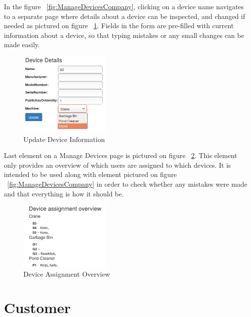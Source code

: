 In the figure ~\ref{fig:ManageDevicesCompany}, clicking on a device name navigates to a separate page where details about a device can be inspected, and changed if needed as pictured on figure ~\ref{fig:DeviceDetailsUpdate}. Fields in the form are pre-filled with current information about a device, so that typing mistakes or any small changes can be made easily.

\begin{figure}[ht]
	\begin{center}
		\includegraphics[width=0.4\textwidth]{images/implementation/DeviceDetailsUpdate}
		\caption{Update Device Information}
		\label{fig:DeviceDetailsUpdate}
	\end{center}
\end{figure}

Last element on a Manage Devices page is pictured on figure ~\ref{fig:DeviceAssignment}. This element only provides an overview of which users are assigned to which devices. It is intended to be used along with element pictured on figure ~\ref{fig:ManageDevicesCompany} in order to check whether any mistakes were made and that everything is how it should be.

\begin{figure}[ht]
	\begin{center}
		\includegraphics[width=0.4\textwidth]{images/implementation/DeviceAssignment}
		\caption{Device Assignment Overview}
		\label{fig:DeviceAssignment}
	\end{center}
\end{figure}


\section{Customer}
\label{section:customer}

